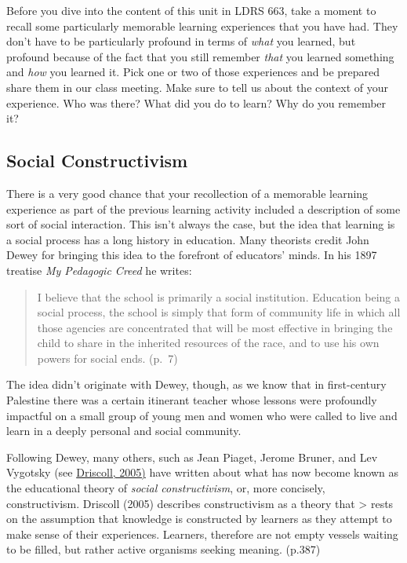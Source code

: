 \documentclass[
]{book}
\begin{document}
Before you dive into the content of this unit in LDRS 663, take a moment to recall some particularly memorable learning experiences that you have had. They don't have to be particularly profound in terms of \emph{what} you learned, but profound because of the fact that you still remember \emph{that} you learned something and \emph{how} you learned it. Pick one or two of those experiences and be prepared share them in our class meeting. Make sure to tell us about the context of your experience. Who was there? What did you do to learn? Why do you remember it?

\hypertarget{social-constructivism}{%
\subsection*{Social Constructivism}\label{social-constructivism}}

There is a very good chance that your recollection of a memorable learning experience as part of the previous learning activity included a description of some sort of social interaction. This isn't always the case, but the idea that learning is a social process has a long history in education. Many theorists credit John Dewey for bringing this idea to the forefront of educators' minds. In his 1897 treatise \emph{My Pedagogic Creed} he writes:

\begin{quote}
I believe that the school is primarily a social institution. Education being a social process, the school is simply that form of community life in which all those agencies are concentrated that will be most effective in bringing the child to share in the inherited resources of the race, and to use his own powers for social ends. (p.~7)
\end{quote}

The idea didn't originate with Dewey, though, as we know that in first-century Palestine there was a certain itinerant teacher whose lessons were profoundly impactful on a small group of young men and women who were called to live and learn in a deeply personal and social community.

Following Dewey, many others, such as Jean Piaget, Jerome Bruner, and Lev Vygotsky (see \href{https://twu.idm.oclc.org/login?url=http://search.ebscohost.com/login.aspx?direct=true\&db=cat05965a\&AN=alc.1254633\&site=eds-live}{Driscoll, 2005)} have written about what has now become known as the educational theory of \emph{social constructivism}, or, more concisely, constructivism. Driscoll (2005) describes constructivism as a theory that
\textgreater{} rests on the assumption that knowledge is constructed by learners as they attempt to make sense of their experiences. Learners, therefore are not empty vessels waiting to be filled, but rather active organisms seeking meaning. (p.387)
\end{document}

